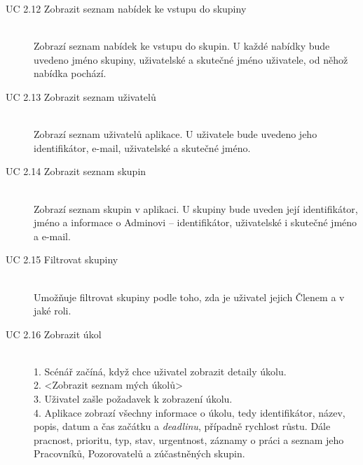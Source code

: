 \documentclass[thesis=B,czech]{FITthesis}[2012/06/26]
\begin{document}
\begin{description}
				\item[UC 2.12 Zobrazit seznam nabídek ke vstupu do skupiny] \hfill \\
					Zobrazí seznam nabídek ke vstupu do skupin. U každé nabídky bude uvedeno jméno skupiny, uživatelské a skutečné jméno uživatele, od něhož nabídka pochází.
				
				\item[UC 2.13 Zobrazit seznam uživatelů] \hfill \\
					Zobrazí seznam uživatelů aplikace. U uživatele bude uvedeno jeho identifikátor, e-mail, uživatelské a skutečné jméno.
					
				\item[UC 2.14 Zobrazit seznam skupin] \hfill \\
					Zobrazí seznam skupin v aplikaci. U skupiny bude uveden její identifikátor, jméno a informace o Adminovi -- identifikátor, uživatelské i skutečné jméno a e-mail.
					
				\item[UC 2.15 Filtrovat skupiny] \hfill \\
					Umožňuje filtrovat skupiny podle toho, zda je uživatel jejich Členem a v jaké roli.
					
				\item[UC 2.16 Zobrazit úkol] \hfill \\
					1. Scénář začíná, když chce uživatel zobrazit detaily úkolu. \\
					2. <Zobrazit seznam mých úkolů> \\
					3. Uživatel zašle požadavek k zobrazení úkolu. \\
					4. Aplikace zobrazí všechny informace o úkolu, tedy identifikátor, název, popis, datum a čas začátku a \textit{deadlinu}, případně rychlost růstu. Dále pracnost, prioritu, typ, stav, urgentnost, záznamy o práci a seznam jeho Pracovníků, Pozorovatelů a zúčastněných skupin. \\
					

\end{description}
\end{document}
